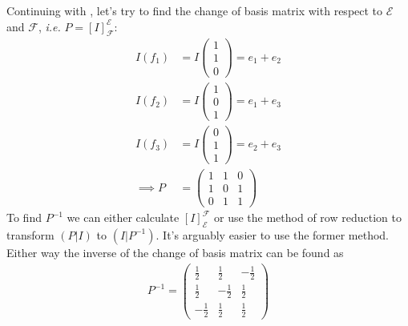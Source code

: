 \begin{exm}\label{exm-change-of-basis-matrix}
	Continuing with , let's try to find the
	change of basis matrix with respect to $\mathcal{E}$ and $\mathcal{F}$, \textit{i.e.}
	$P=[I]_\mathcal{F}^\mathcal{E}$:
	\begin{align*}
		I(f_1) & =I\begin{pmatrix}1\\1\\0\end{pmatrix}=e_1+e_2 \\
		I(f_2) & =I\begin{pmatrix}1\\0\\1\end{pmatrix}=e_1+e_3 \\
		I(f_3) & =I\begin{pmatrix}0\\1\\1\end{pmatrix}=e_2+e_3 \\
		\implies
		P      & =\begin{pmatrix}
			1 & 1 & 0 \\
			1 & 0 & 1 \\
			0 & 1 & 1
		\end{pmatrix}
	\end{align*}
	To find $P^{-1}$ we can either calculate $[I]_\mathcal{E}^\mathcal{F}$ or
	use the method of row reduction to transform $(P|I)$ to $(I|P^{-1})$. It's
	arguably easier to use the former method. Either way the inverse of the change
	of basis matrix can be found as
	\begin{align*}
		P^{-1}=\begin{pmatrix}
			\frac{1}{2}  & \frac{1}{2}  & -\frac{1}{2} \\[4pt]
			\frac{1}{2}  & -\frac{1}{2} & \frac{1}{2}  \\[4pt]
			-\frac{1}{2} & \frac{1}{2}  & \frac{1}{2}
		\end{pmatrix}
	\end{align*}
\end{exm}

